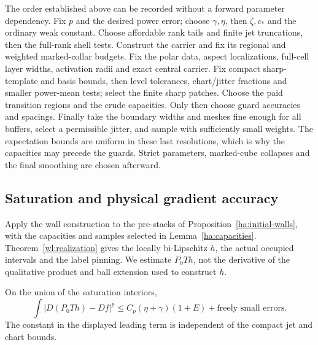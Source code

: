 \begin{remark}\label{ha:scale-order}
The order established above can be recorded without a forward
parameter dependency.  Fix $p$ and the desired power error; choose
$\gamma,\eta$, then $\zeta,c_*$ and the ordinary weak constant.
Choose affordable rank tails and finite jet truncations, then the
full-rank shell tests.  Construct the carrier and fix its regional
and weighted marked-collar budgets.  Fix the polar data, aspect
localizations, full-cell layer widths, activation radii and exact
central carrier.  Fix compact sharp-template and basis bounds,
then level tolerances, chart/jitter fractions and smaller
power-mean tests; select the finite sharp patches.  Choose the paid
transition regions and the crude capacities.  Only then choose
guard accuracies and spacings.  Finally take the boundary widths
and meshes fine enough for all buffers, select a permissible
jitter, and sample with sufficiently small weights.  The expectation
bounds are uniform in these last resolutions, which is why the
capacities may precede the guards.  Strict parameters, marked-cube
collapses and the final smoothing are chosen afterward.
\end{remark}

\subsection{Saturation and physical gradient accuracy}
\label{ha:saturation-subsection}

Apply the wall construction to the pre-stacks of
Proposition~\ref{ha:initial-walls}, with the capacities and samples
selected in Lemma~\ref{ha:capacities}.  Theorem~\ref{wl:realization} gives the
locally bi-Lipschitz $h$, the actual occupied intervals and the
label pinning.  We estimate $P_0Th$, not the derivative of the
qualitative product and ball extension used to construct $h$.

\begin{lemma}\label{ha:saturation}
On the union of the saturation interiors,
\begin{equation}\label{ha:physical-saturation}
 \int |D(P_0Th)-Df|^p
       \le C_p(\eta+\gamma)(1+E)
                         +\text{freely small errors}.
\end{equation}
The constant in the displayed leading term is independent of the
compact jet and chart bounds.
\end{lemma}

